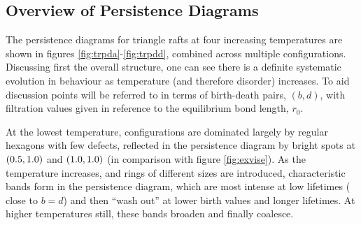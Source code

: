 \subsection{Overview of Persistence Diagrams}

The persistence diagrams for triangle rafts at four increasing temperatures are shown in figures \ref{fig:trpda}\--\ref{fig:trpdd}, combined across multiple configurations.
Discussing first the overall structure, one can see there is a definite systematic evolution in behaviour as temperature (and therefore disorder) increases.
To aid discussion points will be referred to in terms of birth\--death pairs, $\left(b,d\right)$, with filtration values given in reference to the equilibrium bond length, $r_0$.

At the lowest temperature, configurations are dominated largely by regular hexagons with few defects, reflected in the persistence diagram by bright spots at $\left(0.5,1.0\right)$ and $\left(1.0,1.0\right)$ (in comparison with figure \ref{fig:exvise}).
As the temperature increases, and rings of different sizes are introduced, characteristic bands form in the persistence diagram, which are most intense at low lifetimes (\ie{} close to $b=d$) and then ``wash out'' at lower birth values and longer lifetimes. 
At higher temperatures still, these bands broaden and finally coalesce.

